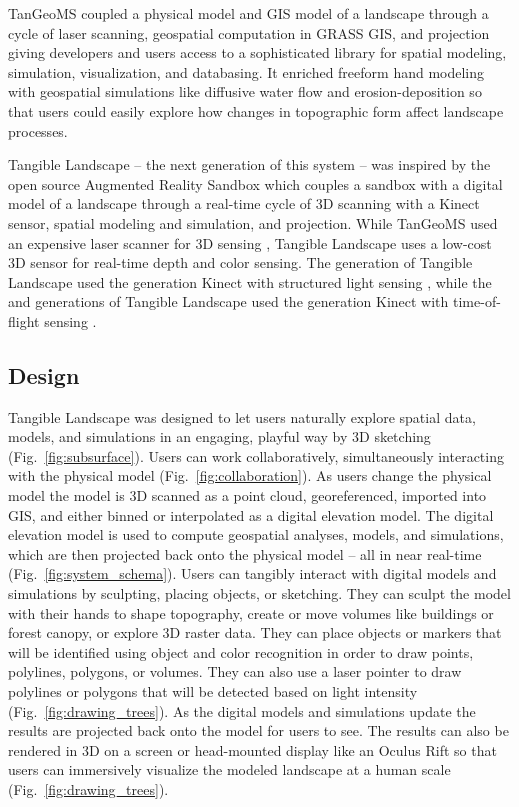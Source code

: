 \documentclass[prodmode,acmtochi]{acmsmall} %
\begin{document}
TanGeoMS coupled a physical model and GIS model of a landscape 
through a cycle of laser scanning, 
geospatial computation in GRASS GIS, and projection
giving developers and users access to 
a sophisticated library for 
spatial modeling, simulation, visualization, and databasing.
It enriched freeform hand modeling with geospatial simulations 
like diffusive water flow and erosion-deposition 
so that users could easily explore how 
changes in topographic form affect landscape processes. 

Tangible Landscape -- the next generation of this system -- was inspired by
the open source Augmented Reality Sandbox \cite{Kreylos2012}
which couples a sandbox with a digital model of a landscape 
through a real-time cycle of 3D scanning with a Kinect sensor, spatial modeling and simulation, and projection.
While TanGeoMS used an expensive laser scanner
for 3D sensing \cite{Tateosian2010}, 
Tangible Landscape uses a low-cost 3D sensor %
for real-time depth and color sensing. 
The  generation of Tangible Landscape \cite{Petrasova2014} 
used the  generation Kinect with structured light sensing \cite{Smisek2011}, 
while the   \cite{Petrasova2015} and  generations of Tangible Landscape 
used the  generation Kinect with time-of-flight sensing \cite{Bamji2015}. 


\subsection{Design}
Tangible Landscape was designed to let users naturally explore 
spatial data, models, and simulations in an engaging, playful way
by 3D sketching (Fig.~\ref{fig:subsurface}). 
Users can work collaboratively, 
simultaneously interacting with the physical model 
(Fig.~\ref{fig:collaboration}). 
As users change the physical model
the model is 3D scanned as a point cloud, georeferenced, imported into GIS, 
and either binned or interpolated as a digital elevation model. 
The digital elevation model is used to compute 
geospatial analyses, models, and simulations, 
which are then projected back onto the physical model 
-- all in near real-time (Fig.~\ref{fig:system_schema}). 
Users can tangibly interact with digital models and simulations
by sculpting, placing objects, or sketching.
They can sculpt the model with their hands
to shape topography, 
create or move volumes
like buildings or forest canopy, 
or explore 3D raster data.  
They can place objects or markers 
that will be identified using object and color recognition
in order to draw points, polylines, polygons, or volumes. 
They can also use a laser pointer to draw polylines or polygons
that will be detected based on light intensity (Fig.~\ref{fig:drawing_trees}). 
As the digital models and simulations update
the results are projected back onto the model for users to see. 
The results can also be rendered in 3D 
on a screen or head-mounted display like an Oculus Rift
so that users can immersively visualize the modeled landscape 
at a human scale 
(Fig.~\ref{fig:drawing_trees}).
\end{document}

